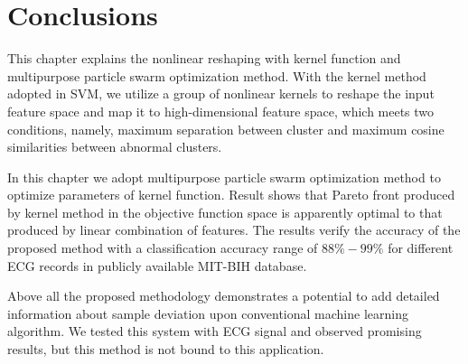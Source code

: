 \section{Conclusions}

This chapter explains the nonlinear reshaping with kernel function and multipurpose particle swarm optimization method. With the kernel method adopted in SVM, we utilize a group of nonlinear kernels to reshape the input feature space and map it to high-dimensional feature space, which meets two conditions, namely, maximum separation between cluster and maximum cosine similarities between abnormal clusters.

In this chapter we adopt multipurpose particle swarm optimization method to optimize parameters of kernel function. Result shows that Pareto front produced by kernel method in the objective function space is apparently optimal to that produced by linear combination of features. The results verify the accuracy of the proposed method with a classification accuracy range of $88\%-99\%$ for different ECG records in publicly available MIT-BIH database.

Above all the proposed methodology demonstrates a potential to add detailed information about sample deviation upon conventional machine learning algorithm. We tested this system with ECG signal and observed promising results, but this method is not bound to this application. 
  